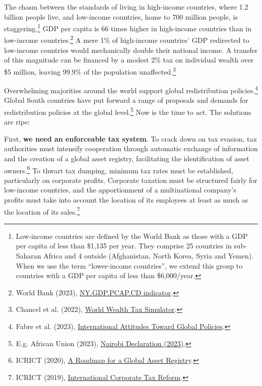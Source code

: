 \documentclass[a5paper,english,openany]{memoir}
\begin{document}
The chasm between the standards of living in high-income countries, where 1.2 billion people live, and low-income countries, home to 700 million people, is staggering.\footnote{Low-income countries are defined by the World Bank as those with a GDP per capita of less than \$1,135 per year. They comprise 25 countries in sub-Saharan Africa and 4 outside (Afghanistan, North Korea, Syria and Yemen). When we use the term ``lower-income countries'', we extend this group to countries with a GDP per capita of less than \$6,000/year.} %
GDP per capita is 66 times higher in high-income countries than in low-income countries.\footnote{World Bank (2023), \href{https://data.worldbank.org/indicator/NY.GDP.PCAP.CD?end=2022\&locations=EU-ZG-XD-XM-1W-IN-US-CD-BI-LU-CN\&start=2022\&view=bar}{NY.GDP.PCAP.CD indicator}.} 
A mere 1\% of high-income countries' GDP redirected to low-income countries would mechanically double their national income. A transfer of this magnitude can be financed by a modest 2\% tax on individual wealth over \$5 million, leaving 99.9\% of the population unaffected.\footnote{Chancel et al. (2022), \href{https://wid.world/world-wealth-tax-simulator/}{World Wealth Tax Simulator}.}%

Overwhelming majorities around the world support global redistribution policies.\footnote{Fabre et al. (2023), \href{https://papers.ssrn.com/sol3/papers.cfm?abstract\_id=4448523}{International Attitudes Toward Global Policies}.} 
Global South countries have put forward a range of proposals and demands for redistribution policies at the global level.\footnote{E.g. African Union (2023), \href{https://media.africaclimatesummit.org/NAIROBI+Declaration+FURTHER+edited+060923+EN+920AM.pdf}{Nairobi Declaration (2023)}.} Now is the time to act. The solutions are ripe:

First, \textbf{we need an enforceable tax system}. To crack down on tax evasion, tax authorities must intensify cooperation through automatic exchange of information and the creation of a global asset registry, facilitating the identification of asset owners.\footnote{ICRICT (2020), \href{https://static1.squarespace.com/static/5a0c602bf43b5594845abb81/t/5c988368eef1a1538c2ae7eb/1553498989927/GAR.pdf}{A Roadmap for a Global Asset Registry}.} 
To thwart tax dumping, minimum tax rates must be established, particularly on corporate profits. Corporate taxation must be structured fairly for low-income countries, and the apportionment of a multinational company's profits must take into account the location of its employees at least as much as the location of its sales.\footnote{ICRICT (2019), \href{https://static1.squarespace.com/static/5a0c602bf43b5594845abb81/t/5d979e6dc5f7cb7b66842c49/1570217588721/ICRICT-INTERNATIONAL+CORPORATE+TAX+REFORM.pdf}{International Corporate Tax Reform}.}%
\end{document}
